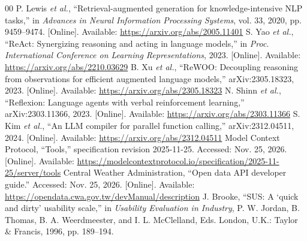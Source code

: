 \documentclass[conference]{IEEEtran}
\begin{document}
\begin{thebibliography}{00}
 P. Lewis \emph{et al.}, ``Retrieval-augmented generation for knowledge-intensive NLP tasks,'' in \emph{Advances in Neural Information Processing Systems}, vol. 33, 2020, pp. 9459--9474. [Online]. Available: \url{https://arxiv.org/abs/2005.11401}
 S. Yao \emph{et al.}, ``ReAct: Synergizing reasoning and acting in language models,'' in \emph{Proc. International Conference on Learning Representations}, 2023. [Online]. Available: \url{https://arxiv.org/abs/2210.03629}
 B. Xu \emph{et al.}, ``ReWOO: Decoupling reasoning from observations for efficient augmented language models,'' arXiv:2305.18323, 2023. [Online]. Available: \url{https://arxiv.org/abs/2305.18323}
 N. Shinn \emph{et al.}, ``Reflexion: Language agents with verbal reinforcement learning,'' arXiv:2303.11366, 2023. [Online]. Available: \url{https://arxiv.org/abs/2303.11366}
 S. Kim \emph{et al.}, ``An LLM compiler for parallel function calling,'' arXiv:2312.04511, 2024. [Online]. Available: \url{https://arxiv.org/abs/2312.04511}
 Model Context Protocol, ``Tools,'' specification revision 2025-11-25. Accessed: Nov. 25, 2026. [Online]. Available: \url{https://modelcontextprotocol.io/specification/2025-11-25/server/tools}
 Central Weather Administration, ``Open data API developer guide.'' Accessed: Nov. 25, 2026. [Online]. Available: \url{https://opendata.cwa.gov.tw/devManual/description}
 J. Brooke, ``SUS: A `quick and dirty' usability scale,'' in \emph{Usability Evaluation in Industry}, P. W. Jordan, B. Thomas, B. A. Weerdmeester, and I. L. McClelland, Eds. London, U.K.: Taylor \& Francis, 1996, pp. 189--194.
\end{thebibliography}
\end{document}
